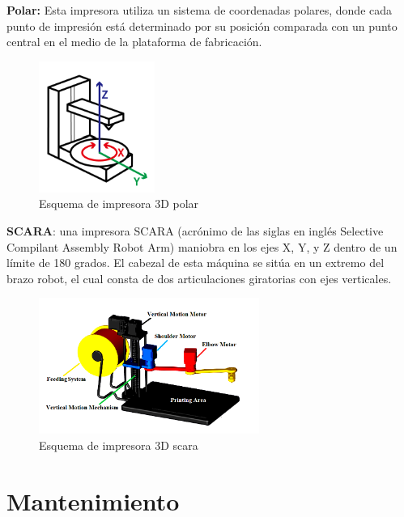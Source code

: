 \begin{description}
\item \textbf{Polar:} Esta impresora utiliza un sistema de coordenadas polares, donde cada punto de impresión está determinado por su posición comparada con un punto central en el medio de la plataforma de fabricación.

\begin{figure}[H]
\centering
\includegraphics[scale=0.8]{images/polar.png}
\caption{Esquema de impresora 3D polar \citep{takamori2018}}
\end{figure}

\item \textbf{SCARA}: una impresora SCARA (acrónimo de las siglas en inglés Selective Compilant Assembly Robot Arm) maniobra en los ejes X, Y, y Z dentro de un límite de 180 grados. El cabezal de esta máquina se sitúa en un extremo del brazo robot, el cual consta de dos articulaciones giratorias con ejes verticales.

\begin{figure}[H]
\centering
\includegraphics[scale=0.8]{images/scara.png}
\caption{Esquema de impresora 3D scara \citep{saygin2016}}
\end{figure}



\end{description}

\pagebreak
\section{Mantenimiento}

